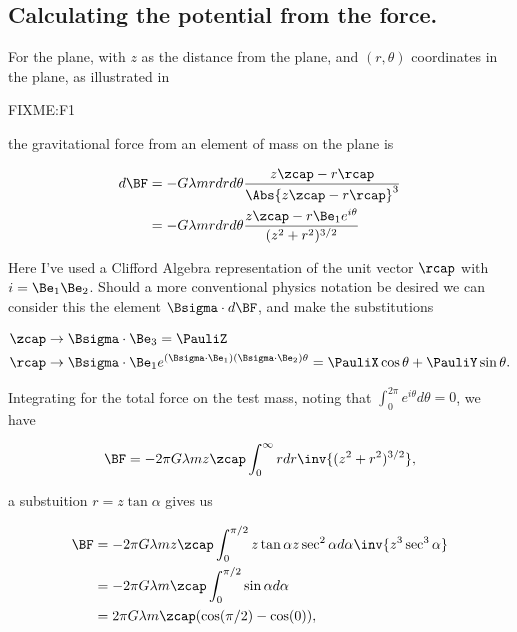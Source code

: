 \subsection{Calculating the potential from the force.}

For the plane, with $z$ as the distance from the plane, and $(r,\theta)$ coordinates in the plane, as illustrated in

FIXME:F1

the gravitational force from an element of mass on the plane is

\begin{align*}
d\BF 
&= -G \lambda m r dr d\theta \frac{z \zcap - r \rcap}{\Abs{z \zcap - r \rcap}^3 } \\
&= -G \lambda m r dr d\theta \frac{z \zcap - r \Be_1 e^{i \theta} }{(z^2 + r^2)^{3/2} } \\
\end{align*}

Here I've used a Clifford Algebra representation of the unit vector $\rcap$ with $i = \Be_1 \Be_2$.  Should a more conventional physics notation be desired we can consider this the element $\Bsigma \cdot d\BF$, and make the substitutions

\begin{align*}
\zcap &\rightarrow \Bsigma \cdot \Be_3 = \PauliZ
\\
\rcap &\rightarrow \Bsigma \cdot \Be_1 e^{ (\Bsigma \cdot \Be_1) (\Bsigma \cdot \Be_2) \theta} = \PauliX \cos\theta + \PauliY \sin\theta.
\end{align*}

Integrating for the total force on the test mass, noting that $\int_0^{2 \pi} e^{i\theta} d\theta = 0$, we have

\begin{equation}\label{eqn:classicalMechanicsPs2:n}
\BF = - 2 \pi G \lambda m z \zcap \int_0^\infty r dr \inv{(z^2 + r^2)^{3/2} },
\end{equation}

a substuition $r = z \tan \alpha$ gives us

\begin{align*}
\BF 
&= - 2 \pi G \lambda m z \zcap \int_0^{\pi/2} z \tan \alpha z \sec^2 \alpha d\alpha \inv{z^3 \sec^3 \alpha } \\
&= - 2 \pi G \lambda m \zcap \int_0^{\pi/2} \sin \alpha d\alpha \\
&= 2 \pi G \lambda m \zcap (\cos(\pi/2) - \cos(0)),
\end{align*}

